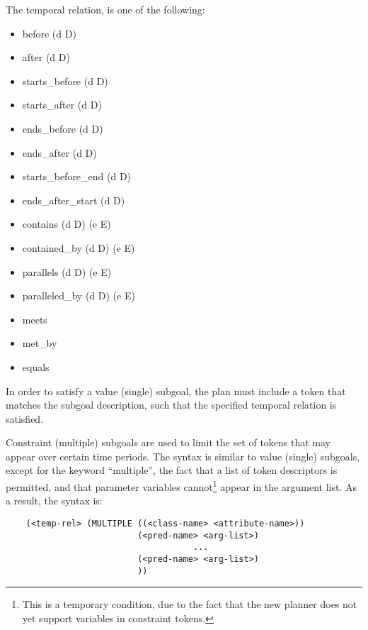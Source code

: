 The temporal relation, {\tt <temp-rel>} is one of the following:
\begin{itemize}
\item before (d D)
\item after (d D)
\item starts\_before (d D)
\item starts\_after (d D)
\item ends\_before (d D)
\item ends\_after (d D)
\item starts\_before\_end (d D)
\item ends\_after\_start (d D)
\item contains (d D) (e E)
\item contained\_by (d D) (e E)
\item parallels (d D) (e E)
\item paralleled\_by (d D) (e E)
\item meets
\item met\_by
\item equals
\end{itemize}

In order to satisfy a value (single) subgoal, the plan must include a 
token that matches the subgoal description, such that the specified 
temporal relation is satisfied.  

Constraint (multiple) subgoals are used to limit the set of tokens
that may appear over certain time periods.  The syntax is similar to
value (single) subgoals, except for the keyword ``multiple'', the fact
that a list of token descriptors is permitted, and that parameter
variables cannot\footnote{This is a temporary condition, due to the
fact that the new planner does not yet support variables in constraint
tokens.} appear in the argument list.  As a result, the syntax is:
\begin{verbatim}
    (<temp-rel> (MULTIPLE ((<class-name> <attribute-name>))
                          (<pred-name> <arg-list>)
                                     ...
                          (<pred-name> <arg-list>)
                          ))
\end{verbatim}


